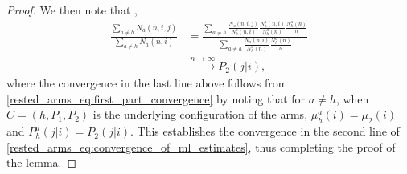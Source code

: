 \begin{proof}
We then note that ,
\begingroup\allowdisplaybreaks\begin{align}
	\frac{\sum\limits_{a\neq h}N_a(n,i,j)}{\sum\limits_{a\neq h}N_a(n,i)}&=\frac{\sum\limits_{a\neq h}\frac{N_a(n,i,j)}{N_h^a(n,i)}\frac{N_h^a(n,i)}{N_h^a(n)}\frac{N_h^a(n)}{n}}{\sum\limits_{a\neq h}\frac{N_a(n,i)}{N_h^a(n)}\frac{N_h^a(n)}{n}}\nonumber\\
	&\stackrel{n\to\infty}{\longrightarrow} P_2(j|i),
\end{align}\endgroup
where the convergence in the last line above follows from \eqref{rested_arms_eq:first_part_convergence} by noting that for $a\neq h$, when $C=(h,P_1,P_2)$ is the underlying configuration of the arms, $\mu_h^a(i)=\mu_2(i)$ and $P_h^a(j|i)=P_2(j|i)$. This establishes the convergence in the second line of \eqref{rested_arms_eq:convergence_of_ml_estimates}, thus completing the proof of the lemma.
\end{proof}

